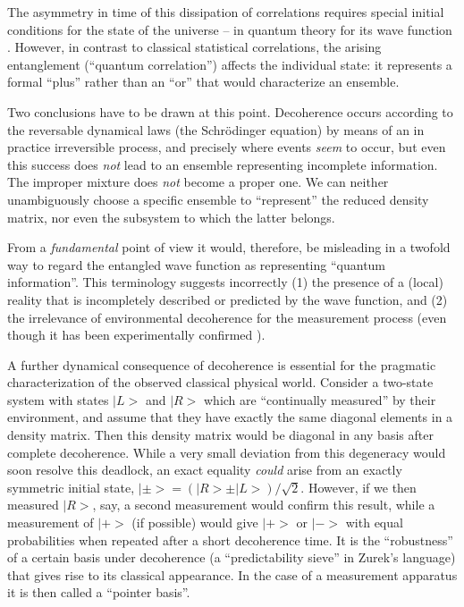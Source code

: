 The asymmetry in time of
this dissipation of correlations requires special initial conditions
for the state of the universe -- in quantum theory for its
wave function \cite{TD}.  However, in contrast to classical
statistical correlations, the arising entanglement
(``quantum correlation'') affects the individual state:  it represents
a formal ``plus'' rather than an ``or'' that would characterize an
ensemble.

Two conclusions have to be drawn at this point. Decoherence occurs
according to the reversable dynamical laws (the Schr\"odinger
equation) by means of an in practice irreversible process, and
precisely where events {\it seem} to occur, but even this success does
{\it not} lead to an ensemble representing incomplete information. The
improper mixture does {\it not} become a proper one. We can neither
unambiguously choose a specific ensemble to ``represent'' the reduced
density matrix, nor even the  subsystem to which the latter belongs.

 From a {\it fundamental} point of view it would, therefore, be
misleading in a twofold way to regard the entangled wave function as
representing ``quantum information''. This terminology suggests
incorrectly (1) the presence of a (local) reality that is
incompletely described or predicted by the wave function, and (2) the
irrelevance of environmental decoherence  for the measurement process
(even though it has been experimentally confirmed
\cite{haroche}).

A further dynamical consequence of decoherence is essential for the
pragmatic characterization of the observed classical physical world.
Consider a two-state system with states $|L>$ and $|R>$ which are
``continually measured'' by their environment, and assume that they
have exactly the same diagonal elements in a density matrix. Then this
density matrix would be diagonal in any basis after complete
decoherence. While a very small deviation from this degeneracy would
soon resolve this deadlock, an exact equality {\it could} arise from
an exactly symmetric initial state,
$|\pm> = (|R>
\pm |L>)/\sqrt{2}$. However, if we then
measured
$|R>$, say, a second measurement would confirm this result, while a
measurement of
$|+>$ (if possible) would give $|+>$ or
$|->$ with equal probabilities when repeated after a short decoherence
time. It is the ``robustness'' of a certain basis  under decoherence
(a ``predictability sieve'' in Zurek's language)
that
gives rise to its classical appearance. In the case of a measurement
apparatus it is then called a ``pointer basis''.

